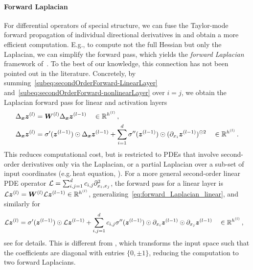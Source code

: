 \paragraph{Forward Laplacian} For differential operators of special structure, we can fuse the Taylor-mode forward propagation of individual directional derivatives in  and obtain a more efficient computation.
E.g., to compute not the full Hessian but only the Laplacian, we can simplify the forward pass, which yields the \emph{forward Laplacian} framework of~\citet{li2023forward}.
To the best of our knowledge, this connection has not been pointed out in the literature.
Concretely, by summing~\eqref{subeq:secondOrderForward-LinearLayer} and~\eqref{subeq:secondOrderForward-nonlinearLayer} over $i=j$, we obtain the Laplacian forward pass for linear and activation layers
\begin{subequations}\label{eq:forward-laplacian-main}
  \begin{align}
    \label{eq:forward_Laplacian_linear}
    \Delta_{\bm{x}}{\bm{z}}^{(l)}
    &=
      {\bm{W}}^{(l)}\Delta_{\bm{x}}{\bm{z}}^{(l-1)}
      \quad \in {\mathbb{R}}^{h^{(l)}}\,,
    \\
    \label{eq:forward_Laplacian_nonlinear}
    \Delta_{\bm{x}}{\bm{z}}^{(l)}
    &=
      \sigma'({\bm{z}}^{(l-1)})\odot\Delta_{\bm{x}}{\bm{z}}^{(l-1)}
      +
      \sum_{i=1}^d \sigma''({\bm{z}}^{(l-1)})\odot (\partial_{x_i}{{\bm{z}}^{(l-1)}})^{\odot 2}
      \quad \in {\mathbb{R}}^{h^{(l)}}\,.
  \end{align}
\end{subequations}
This reduces computational cost, but is restricted to PDEs that involve second-order derivatives only via the Laplacian, or a partial Laplacian over a sub-set of input coordinates (e.g.\,heat equation, ).
For a more general second-order linear PDE operator ${\mathcal{L}} = \sum_{i,j=1}^d c_{i,j} \partial^2_{{x}_i,{x}_j}$, the forward pass for a linear layer is $\mathcal{L} {\bm{z}}^{(l)} = {\bm{W}}^{(l)}\mathcal{L} {\bm{z}}^{(l-1)} \in {\mathbb{R}}^{h^{(l)}}$, generalizing~\eqref{eq:forward_Laplacian_linear}, and similarly for~
\begin{align*}
  \mathcal{L}{\bm{z}}^{(l)}
  &=
    \sigma'({\bm{z}}^{(l-1)})\odot\mathcal{L}{\bm{z}}^{(l-1)}
    +
    \sum_{i,j=1}^d c_{i,j} \sigma''({\bm{z}}^{(l-1)})\odot \partial_{x_i}{{\bm{z}}^{(l-1)}}\odot \partial_{x_j}{{\bm{z}}^{(l-1)}}
    \quad \in {\mathbb{R}}^{h^{(l)}}\,,
\end{align*}
see  for details. This is different from \cite{li2024dof}, which transforms the input space such that the coefficients are diagonal with entries $\{0, \pm 1\}$, reducing the computation to two forward Laplacians.

